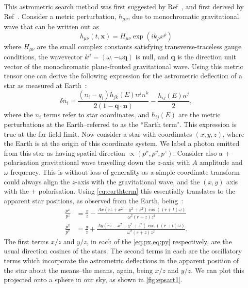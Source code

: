 This astrometric search method was first suggested by Ref~\cite{VB}, and first derived by Ref~\cite{1996ApJ...465..566P}. Consider a metric perturbation, $h_{\mu \nu}$, due to monochromatic gravitational wave that can be written out as
%
\begin{equation}
h_{\mu \nu}(t,\textbf{x})= H_{\mu \nu} \exp( ik_{\rho}x^{\rho } )
\end{equation}
%
where $H_{\mu \nu}$ are the small complex constants satisfying transverse-traceless gauge conditions, the wavevector $k^{\mu} = (\omega, -\omega \textbf{q})$ is null, and $\textbf{q}$ is the direction unit vector of the monochromatic plane-fronted gravitational wave. Using this metric tensor one can derive the following expression for the astrometric deflection of a star as measured at Earth~\cite{Mihaylov_2020,1996ApJ...465..566P}:
%
\begin{equation}
\delta n_i = \frac{(n_i - q_i) h_{jk}(E)n^j n^k}{2(1-\textbf{q} \cdot \textbf{n})}-\frac{h_{ij}(E) n^j}{2},
\label{eq:earthterm}
\end{equation}
%
where the $n_i$ terms refer to star coordinates, and $h_{ij}(E)$ are the metric perturbations at the Earth--referred to as the ``Earth term". This expression is true at the far-field limit. Now consider a star with coordinates $(x,y,z)$, where the Earth is at the origin of this coordinate system. We label a photon emitted from this star as having spatial direction $\propto (p^x,p^y,p^z)$. Consider also a $+$ polarisation gravitational wave travelling down the $z$-axis with $A$ amplitude and $\omega$ frequency. This is without loss of generality as a simple coordinate transform could always align the $z$-axis with the gravitational wave, and the $(x,y)$ axis with the $+$ polarisation. Using \cref{eq:earthterm} this essentially translates to the apparent star positions, as observed from the Earth, being~\cite{Lasenby_2019}:
\begin{align}
    \frac{p^x}{p^z} &= \frac{x}{z}-\frac{A x \left(r z +x^2-y^2+z^2\right)\cos \left(\left(r + t \right) \omega \right) }{\omega^2 \left(r +z \right) z^2} \label{eq:px}\\
    \frac{p^y}{p^z} &= \frac{y}{z}+\frac{A y \left(r z -x^2+y^2+z^2\right)\cos \left(\left(r + t \right) \omega \right) }{\omega^2 \left(r +z \right) z^2}. \label{eq:py}
\end{align}
%
The first terms $x/z$ and $y/z$, in each of the \cref{eq:px,eq:py} respectively, are the usual direction cosines of the stars. The second terms in each are the oscillatory terms which incorporate the astrometric deflections in the apparent position of the star about the means--the means, again, being $x/z$ and $y/z$. We can plot this projected onto a sphere in our sky, as shown in \cref{fig:epsart1}.

